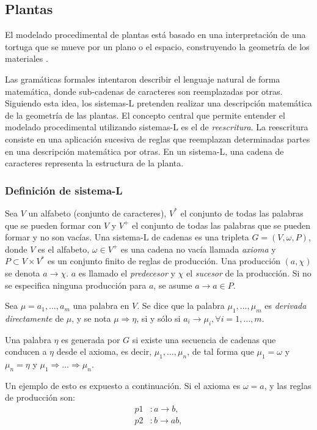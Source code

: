 \subsection{Plantas}
El modelado procedimental de plantas está basado en una interpretación de una tortuga que se mueve por un plano o el espacio, construyendo la geometría de los materiales \cite{Prusinkiewicz1986}.

Las gramáticas formales \cite{Chomsky1956} intentaron describir el lenguaje natural de forma matemática, donde sub-cadenas de caracteres son reemplazadas por otras.
Siguiendo esta idea, los sistemas-L \cite{Lindenmayer1968} pretenden realizar una descripción matemática de la geometría de las plantas.
El concepto central que permite entender el modelado procedimental utilizando sistemas-L es el de {\em reescritura}.
La reescritura consiste en una aplicación sucesiva de reglas que reemplazan determinadas partes en una descripción matemática por otras.
En un sistema-L, una cadena de caracteres representa la estructura de la planta.

\subsubsection{Definición de sistema-L}
Sea $V$ un alfabeto (conjunto de caracteres), $V^{*}$ el conjunto de todas las palabras que se pueden formar con $V$ y $V^{+}$ el conjunto de todas las palabras que se pueden formar y no son vacías.
Una sistema-L de cadenas es una tripleta $G = (V,\omega,P)$, donde $V$ es el alfabeto, $\omega \in V^{+}$ es una cadena no vacía llamada {\em axioma} y $P \subset V \times V^{*}$ es un conjunto finito de reglas de producción.
Una producción $(a,\chi)$ se denota $a \rightarrow \chi$.
$a$ es llamado el {\em predecesor} y $\chi$ el {\em sucesor} de la producción.
Si no se especifica ninguna producción para $a$, se asume $a \rightarrow a \in P$.

Sea $\mu = a_{1}, \dots, a_{m}$ una palabra en $V$.
Se dice que la palabra $\mu_{1}, \dots, \mu_{m}$ es {\em derivada directamente} de $\mu$, y se nota $\mu \Rightarrow \eta$,  si y sólo si $a_{i} \rightarrow \mu_{i}, \forall i = 1, \dots, m$.

Una palabra $\eta$ es generada por $G$ si existe una secuencia de cadenas que conducen a $\eta$ desde el axioma, es decir, $\mu_{1},\dots,\mu_{n}$, de tal forma que $\mu_{1} = \omega$ y $\mu_{n} = \eta$ y $\mu_{1} \Rightarrow \dots  \Rightarrow \mu_{n}$.

Un ejemplo de esto es expuesto a continuación.
Si el axioma es $\omega = a$, y las reglas de producción son:
\begin{align*}
p1 &: a \rightarrow b,\\
p2 &: b \rightarrow ab,
\end{align*}

